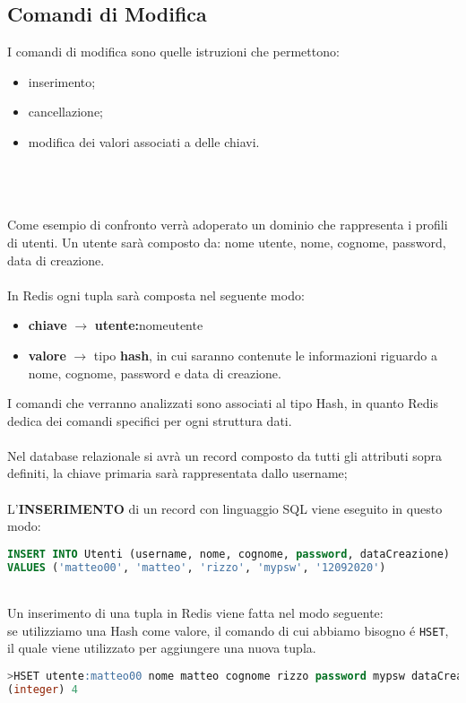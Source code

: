 \subsection{Comandi di Modifica}
I comandi di modifica sono quelle istruzioni che permettono:
\begin{itemize}
    \item inserimento;
    \item cancellazione;
    \item modifica dei valori associati a delle chiavi.\\
\end{itemize}\\
\\
\\
Come esempio di confronto verrà adoperato un dominio che rappresenta i profili di utenti.
Un utente sarà composto da: nome utente, nome, cognome, password, data di creazione.\\
\\
In Redis ogni tupla sarà composta nel seguente modo:
\begin{itemize}
    \item \textbf{chiave} $\to$ \textbf{utente:}nomeutente
    \item \textbf{valore} $\to$ tipo \textbf{hash}, in cui saranno contenute le informazioni riguardo a nome, cognome, password e data di creazione.
\end{itemize}
I comandi che verranno analizzati sono associati al tipo Hash, in quanto Redis dedica dei comandi specifici per ogni struttura dati.\\
\\
Nel database relazionale si avrà un record composto da tutti gli attributi sopra definiti, la chiave primaria sarà rappresentata dallo username;\\
\\
L'\textbf{INSERIMENTO} di un record con linguaggio SQL viene eseguito in questo modo:
\begin{lstlisting}[autogobble, style=redis-cli, language=SQL]
INSERT INTO Utenti (username, nome, cognome, password, dataCreazione)
VALUES ('matteo00', 'matteo', 'rizzo', 'mypsw', '12092020')\end{lstlisting}
\\
Un inserimento di una tupla in Redis viene fatta nel modo seguente:\\
se utilizziamo una Hash come valore, il comando di cui abbiamo bisogno é \texttt{HSET}, il quale viene utilizzato per aggiungere una nuova tupla.
\begin{lstlisting}[autogobble, style=redis-cli, language=SQL]
>HSET utente:matteo00 nome matteo cognome rizzo password mypsw dataCreazione 12092020
(integer) 4\end{lstlisting}
